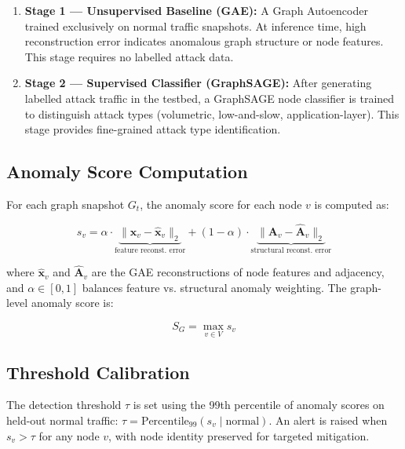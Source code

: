 \begin{enumerate}
  \item \textbf{Stage 1 — Unsupervised Baseline (GAE):} A Graph Autoencoder trained
  exclusively on normal traffic snapshots. At inference time, high reconstruction error
  indicates anomalous graph structure or node features. This stage requires no labelled
  attack data.

  \item \textbf{Stage 2 — Supervised Classifier (GraphSAGE):} After generating labelled
  attack traffic in the testbed, a GraphSAGE node classifier is trained to distinguish
  attack types (volumetric, low-and-slow, application-layer). This stage provides
  fine-grained attack type identification.
\end{enumerate}

\subsection{Anomaly Score Computation}

For each graph snapshot $G_t$, the anomaly score for each node $v$ is computed as:

\begin{equation}
  s_v = \alpha \cdot \underbrace{\|\mathbf{x}_v - \hat{\mathbf{x}}_v\|_2}_{\text{feature reconst. error}}
       + (1-\alpha) \cdot \underbrace{\|\mathbf{A}_v - \hat{\mathbf{A}}_v\|_2}_{\text{structural reconst. error}}
\end{equation}

where $\hat{\mathbf{x}}_v$ and $\hat{\mathbf{A}}_v$ are the GAE reconstructions of
node features and adjacency, and $\alpha \in [0,1]$ balances feature vs. structural
anomaly weighting. The graph-level anomaly score is:

\begin{equation}
  S_G = \max_{v \in V} s_v
\end{equation}

\subsection{Threshold Calibration}

The detection threshold $\tau$ is set using the 99th percentile of anomaly scores on
held-out normal traffic: $\tau = \text{Percentile}_{99}(s_v \mid \text{normal})$.
An alert is raised when $s_v > \tau$ for any node $v$, with node identity preserved
for targeted mitigation.

